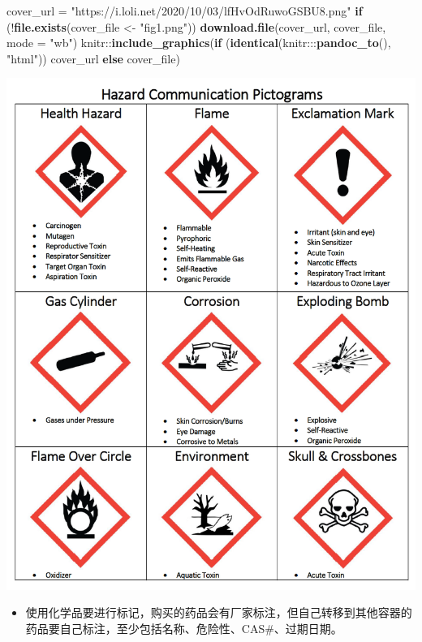 \documentclass[]{tufte-book}
\newenvironment{Shaded}{}{}
\newcommand{\ControlFlowTok}[1]{\textcolor[rgb]{0.00,0.44,0.13}{\textbf{#1}}}
\newcommand{\DataTypeTok}[1]{\textcolor[rgb]{0.56,0.13,0.00}{#1}}
\newcommand{\KeywordTok}[1]{\textcolor[rgb]{0.00,0.44,0.13}{\textbf{#1}}}
\newcommand{\NormalTok}[1]{#1}
\newcommand{\OperatorTok}[1]{\textcolor[rgb]{0.40,0.40,0.40}{#1}}
\newcommand{\StringTok}[1]{\textcolor[rgb]{0.25,0.44,0.63}{#1}}
\providecommand{\tightlist}{%
  \setlength{\itemsep}{0pt}\setlength{\parskip}{0pt}}
\begin{document}
\begin{Shaded}
\begin{Highlighting}[]
\NormalTok{cover_url =}\StringTok{ "https://i.loli.net/2020/10/03/lfHvOdRuwoGSBU8.png"}
\ControlFlowTok{if}\NormalTok{ (}\OperatorTok{!}\KeywordTok{file.exists}\NormalTok{(cover_file <-}\StringTok{ "fig1.png"}\NormalTok{)) }\KeywordTok{download.file}\NormalTok{(cover_url, cover_file, }
    \DataTypeTok{mode =} \StringTok{"wb"}\NormalTok{)}
\NormalTok{knitr}\OperatorTok{::}\KeywordTok{include_graphics}\NormalTok{(}\ControlFlowTok{if}\NormalTok{ (}\KeywordTok{identical}\NormalTok{(knitr}\OperatorTok{:::}\KeywordTok{pandoc_to}\NormalTok{(), }\StringTok{"html"}\NormalTok{)) cover_url }\ControlFlowTok{else}\NormalTok{ cover_file)}
\end{Highlighting}
\end{Shaded}

\includegraphics[width=11.94in]{fig1}

\begin{itemize}
\tightlist
\item
  使用化学品要进行标记，购买的药品会有厂家标注，但自己转移到其他容器的药品要自己标注，至少包括名称、危险性、CAS\#、过期日期。
\end{itemize}
\end{document}
